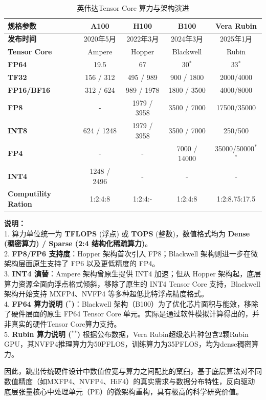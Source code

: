 \documentclass[10.5pt,compsoc,UTF8]{CjC}
\theoremstyle{mystyle}
\begin{document}
\begin{table}[htbp]
    \centering
    \caption{英伟达Tensor Core 算力与架构演进}
    \label{tab:nvidia_compute_evolution_transposed}
    \begin{tabular*}{\textwidth}{@{\extracolsep{\fill}}lcccc@{}}
        \toprule
        \textbf{规格参数} & \textbf{A100} & \textbf{H100 } & \textbf{B100} & \textbf{Vera Rubin}\\
        \midrule
        \textbf{发布时间} & 2020年5月 & 2022年3月 & 2024年3月 &2025年1月\\
        \textbf{Tensor Core} & Ampere & Hopper & Blackwell & Rubin\\
        \midrule
        \textbf{FP64} & 19.5 & 67 & 30$^*$ & 33$^*$\\
        \textbf{TF32} & 156 / 312 & 495 / 989 & 900 / 1800 &  2000/4000\\
        \textbf{FP16/BF16} & 312 / 624 & 989 / 1978 & 1800 / 3500 & 4000/8000\\
        \textbf{FP8} & - & 1979 / 3958 & 3500 / 7000 & 17500/35000\\
        \textbf{INT8} & 624 / 1248 & 1979 / 3958 & 3500 / 7000 & 250/500\\
        \textbf{FP4} & - & - & 7000 / 14000 & 35000/50000$^*$$^*$\\
        \textbf{INT4} & 1248 / 2496 & - & - & -\\
        \textbf{Computility Ration} & 1:2:4:8 & 1:2:4:- & 1:2:4:8& 1:2:8.75:17.5\\
        \bottomrule
    \end{tabular*}
    
    \vspace{0.5em}
    \begin{minipage}{\textwidth} 
        \footnotesize
        \textbf{说明：}\\
        1. 算力单位统一为 \textbf{TFLOPS} (浮点) 或 \textbf{TOPS} (整数)，数值格式均为 \textbf{Dense (稠密算力) / Sparse (2:4 结构化稀疏算力)}。\\
        2. \textbf{FP8/FP6 支持度}：Hopper 架构首次引入 FP8；Blackwell 架构则进一步在微架构层面原生支持了 FP6 以及更低精度的 FP4。\\
        3. \textbf{INT4 演替}：Ampere 架构曾原生提供 INT4 加速；但从 Hopper 架构起，底层算力资源全面向浮点格式倾斜，移除了原生的 INT4 Tensor Core 支持，Blackwell 架构开始支持 MXFP4、NVFP4 等多种超低比特浮点精度格式。\\
        4. \textbf{FP64 算力说明 ($^*$)}：Blackwell 架构（B100）为了优化芯片面积与能效，移除了硬件层面的原生 FP64 Tensor Core 单元。实际是通过软件模拟计算得出的，并非真实的硬件Tensor Core算力支持。\\
        5.  \textbf{Rubin 算力说明 ($^*$$^*$)} 根据公布数据，Vera Rubin超级芯片种包含2颗Rubin GPU，其NVFP4推理算力为50PFLOS，训练算力为35PFLOS，均为dense稠密算力。
    \end{minipage}
\end{table}
因此，跳出传统硬件设计中数值位宽与算力之间配比的窠臼，基于底层算法对不同数值精度（如MXFP4、NVFP4、HiF4）的真实需求与数据分布特性，反向驱动底层张量核心中处理单元（PE）的微架构重构，具有极高的科学研究价值。
\end{document}
